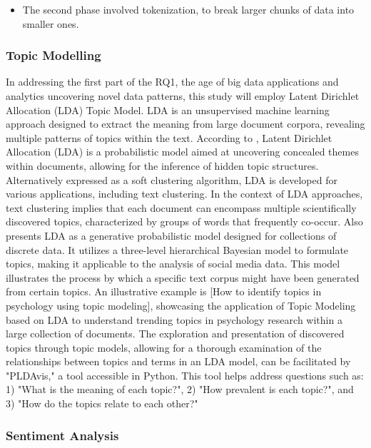 \begin{itemize}
    \item The second phase involved tokenization, to break larger chunks of data into smaller ones.
\end{itemize}

\subsubsection{Topic Modelling}

In addressing the first part of the RQ1, the age of big data applications and analytics uncovering novel data patterns, this study will employ Latent Dirichlet Allocation (LDA) Topic Model. LDA is an unsupervised machine learning approach designed to extract the meaning from large document corpora, revealing multiple patterns of topics within the text.  According to \cite{blei2011introduction}, Latent Dirichlet Allocation (LDA) is a probabilistic model aimed at uncovering concealed themes within documents, allowing for the inference of hidden topic structures. Alternatively expressed as a soft clustering algorithm, LDA is developed for various applications, including text clustering. In the context of LDA approaches, text clustering implies that each document can encompass multiple scientifically discovered topics, characterized by groups of words that frequently co-occur.
Also \cite{blei2003latent} presents LDA as a generative probabilistic model designed for collections of discrete data. It utilizes a three-level hierarchical Bayesian model to formulate topics, making it applicable to the analysis of social media data. This model illustrates the process by which a specific text corpus might have been generated from certain topics. An illustrative example is [How to identify topics in psychology using topic modeling], showcasing the application of Topic Modeling based on LDA to understand trending topics in psychology research within a large collection of documents.
\cite{mabey2018pyldavis}The exploration and presentation of discovered topics through topic models, allowing for a thorough examination of the relationships between topics and terms in an LDA model, can be facilitated by "PLDAvis," a tool accessible in Python. This tool helps address questions such as: 1) "What is the meaning of each topic?", 2) "How prevalent is each topic?", and 3) "How do the topics relate to each other?"

\subsubsection{Sentiment Analysis}

